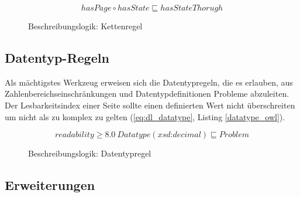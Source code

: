 \documentclass[runningheads,a4paper]{llncs}
\begin{document}
\begin{figure}
\begin{equation}
hasPage \circ hasState \sqsubseteq hasStateThorugh
\label{eq:dl_list}
\end{equation}
\caption{Beschreibungslogik: Kettenregel}
\end{figure}



\subsection{Datentyp-Regeln}
\label{sec:rule_datatype}

Als mächtigstes Werkzeug erweisen sich die Datentypregeln, die es erlauben, aus Zahlenbereichseinschränkungen und Datentypdefinitionen Probleme abzuleiten. 
Der Lesbarkeitsindex einer Seite sollte einen definierten Wert nicht überschreiten um nicht als zu komplex zu gelten (\eqref{eq:dl_datatype}, Listing \ref{datatype_owl}).


\begin{figure}
\begin{equation}
readability \geq 8.0\ Datatype(\textit{xsd:decimal}) \sqsubseteq Problem
\label{eq:dl_datatype}
\end{equation}
\caption{Beschreibungslogik: Datentypregel}
\end{figure}



\subsection{Erweiterungen}
\label{sec:rule_extensions}
\end{document}
